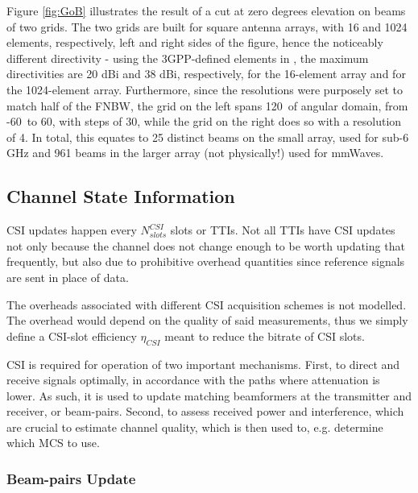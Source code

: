 Figure \ref{fig:GoB} illustrates the result of a cut at zero degrees elevation on beams of two grids. The two grids are built for square antenna arrays, with 16 and 1024 elements, respectively, left and right sides of the figure, hence the noticeably different directivity - using the 3GPP-defined elements in \cite{3gpp-antennas}, the maximum directivities are 20 dBi and 38 dBi, respectively, for the 16-element array and for the 1024-element array. Furthermore, since the resolutions were purposely set to match half of the \ac{FNBW}, the grid on the left spans 120\textdegree \ of angular domain, from -60\textdegree \ to 60\textdegree, with steps of 30\textdegree, while the grid on the right does so with a resolution of 4\textdegree. In total, this equates to 25 distinct beams on the small array, used for sub-6 GHz and 961 beams in the larger array (not physically!) used for mmWaves.



\subsection{Channel State Information}

CSI updates happen every $N^{CSI}_{slots}$ slots or \acsp{TTI}. Not all TTIs have CSI updates not only because the channel does not change enough to be worth updating that frequently, but also due to prohibitive overhead quantities since reference signals are sent in place of data. 

The overheads associated with different \ac{CSI} acquisition schemes is not modelled. The overhead would depend on the quality of said measurements, thus we simply define a CSI-slot efficiency $\eta_{CSI}$ meant to reduce the bitrate of CSI slots.

CSI is required for operation of two important mechanisms. First, to direct and receive signals optimally, in accordance with the paths where attenuation is lower. As such, it is used to update matching beamformers at the transmitter and receiver, or beam-pairs. Second, to assess received power and interference, which are crucial to estimate channel quality, which is then used to, e.g. determine which MCS to use.


\subsubsection*{Beam-pairs Update}

